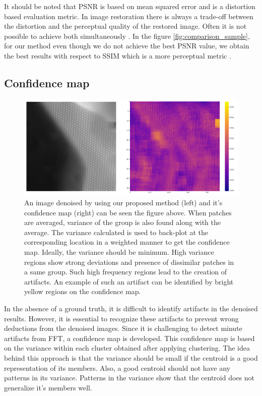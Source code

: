 \documentclass[fleqn,10pt]{wlscirep}
\begin{document}
	It should be noted that PSNR is based on mean squared error and is a distortion based evaluation metric. In image restoration there is always a trade-off between the distortion and the perceptual quality of the restored image. Often it is not possible to achieve both simultaneously \cite{8578750}. In the figure \ref{fig:comparison_sample}, for our method even though we do not achieve the best PSNR value, we obtain the best results with respect to SSIM which is a more perceptual metric \cite{8578750}.
	
	\subsection*{Confidence map}
	
	\begin{figure}
		\centering
		\includegraphics[scale=0.7]{./imgs/confidence_map.png}
		\caption{An image denoised by using our proposed method (left) and it's confidence map (right) can be seen the figure above. When patches are averaged, variance of the group is also found along with the average. The variance calculated is used to back-plot at the corresponding location in a weighted manner to get the confidence map. Ideally, the variance should be minimum. High variance regions show strong deviations and presence of dissimilar patches in a same group. Such high frequency regions lead to the creation of artifacts. An example of such an artifact can be identified by bright yellow regions on the confidence map.}
		\label{fig:confidence_map}
	\end{figure}
	
	In the absence of a ground truth, it is difficult to identify artifacts in the denoised results. However, it is essential to recognize these artifacts to prevent wrong deductions from the denoised images. Since it is challenging to detect minute artifacts from FFT, a confidence map is developed. This confidence map is based on the variance within each cluster obtained after applying clustering. The idea behind this approach is that the variance should be small if the centroid is a good representation of its members. Also, a good centroid should not have any patterns in its variance. Patterns in the variance show that the centroid does not generalize it's members well. 
	
\end{document}
